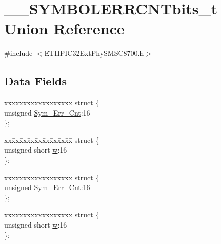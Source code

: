 \hypertarget{union_____s_y_m_b_o_l_e_r_r_c_n_tbits__t}{}\section{\+\_\+\+\_\+\+S\+Y\+M\+B\+O\+L\+E\+R\+R\+C\+N\+Tbits\+\_\+t Union Reference}
\label{union_____s_y_m_b_o_l_e_r_r_c_n_tbits__t}


{\ttfamily \#include $<$E\+T\+H\+P\+I\+C32\+Ext\+Phy\+S\+M\+S\+C8700.\+h$>$}

\subsection*{Data Fields}
\begin{DoxyCompactItemize}
\item 
\begin{tabbing}
xx\=xx\=xx\=xx\=xx\=xx\=xx\=xx\=xx\=\kill
struct \{\\
\>unsigned \hyperlink{union_____s_y_m_b_o_l_e_r_r_c_n_tbits__t_ace632af6668e7ddb8dfcefca6dcac346}{Sym\_Err\_Cnt}:16\\
\}; \\

\end{tabbing}\item 
\begin{tabbing}
xx\=xx\=xx\=xx\=xx\=xx\=xx\=xx\=xx\=\kill
struct \{\\
\>unsigned short \hyperlink{union_____s_y_m_b_o_l_e_r_r_c_n_tbits__t_a160850a4684a3e82c2323033964f2e98}{w}:16\\
\}; \\

\end{tabbing}\item 
\begin{tabbing}
xx\=xx\=xx\=xx\=xx\=xx\=xx\=xx\=xx\=\kill
struct \{\\
\>unsigned \hyperlink{union_____s_y_m_b_o_l_e_r_r_c_n_tbits__t_ace632af6668e7ddb8dfcefca6dcac346}{Sym\_Err\_Cnt}:16\\
\}; \\

\end{tabbing}\item 
\begin{tabbing}
xx\=xx\=xx\=xx\=xx\=xx\=xx\=xx\=xx\=\kill
struct \{\\
\>unsigned short \hyperlink{union_____s_y_m_b_o_l_e_r_r_c_n_tbits__t_a160850a4684a3e82c2323033964f2e98}{w}:16\\
\}; \\

\end{tabbing}\end{DoxyCompactItemize}


